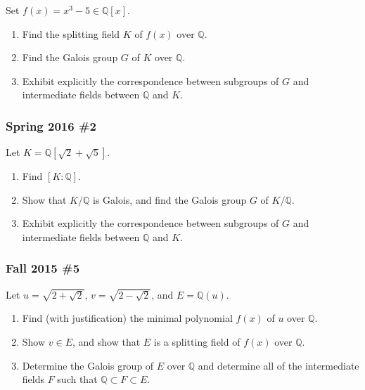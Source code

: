 Set \(f(x) = x^3 - 5 \in {\mathbb{Q}}[x]\).

\begin{enumerate}
\def\labelenumi{\alph{enumi}.}
\item
  Find the splitting field \(K\) of \(f(x)\) over \({\mathbb{Q}}\).
\item
  Find the Galois group \(G\) of \(K\) over \({\mathbb{Q}}\).
\item
  Exhibit explicitly the correspondence between subgroups of \(G\) and
  intermediate fields between \({\mathbb{Q}}\) and \(K\).
\end{enumerate}

\hypertarget{spring-2016-2}{%
\subsubsection{Spring 2016 \#2}\label{spring-2016-2}}

Let \(K = {\mathbb{Q}}[\sqrt 2 + \sqrt 5]\).

\begin{enumerate}
\def\labelenumi{\alph{enumi}.}
\item
  Find \([K: {\mathbb{Q}}]\).
\item
  Show that \(K/{\mathbb{Q}}\) is Galois, and find the Galois group
  \(G\) of \(K/{\mathbb{Q}}\).
\item
  Exhibit explicitly the correspondence between subgroups of \(G\) and
  intermediate fields between \({\mathbb{Q}}\) and \(K\).
\end{enumerate}

\hypertarget{fall-2015-5}{%
\subsubsection{Fall 2015 \#5}\label{fall-2015-5}}

Let \(u = \sqrt{2 + \sqrt{2}}\), \(v = \sqrt{2 - \sqrt{2}}\), and
\(E = {\mathbb{Q}}(u)\).

\begin{enumerate}
\def\labelenumi{\alph{enumi}.}
\item
  Find (with justification) the minimal polynomial \(f(x)\) of \(u\)
  over \({\mathbb{Q}}\).
\item
  Show \(v\in E\), and show that \(E\) is a splitting field of \(f(x)\)
  over \({\mathbb{Q}}\).
\item
  Determine the Galois group of \(E\) over \({\mathbb{Q}}\) and
  determine all of the intermediate fields \(F\) such that
  \({\mathbb{Q}}\subset F \subset E\).
\end{enumerate}

